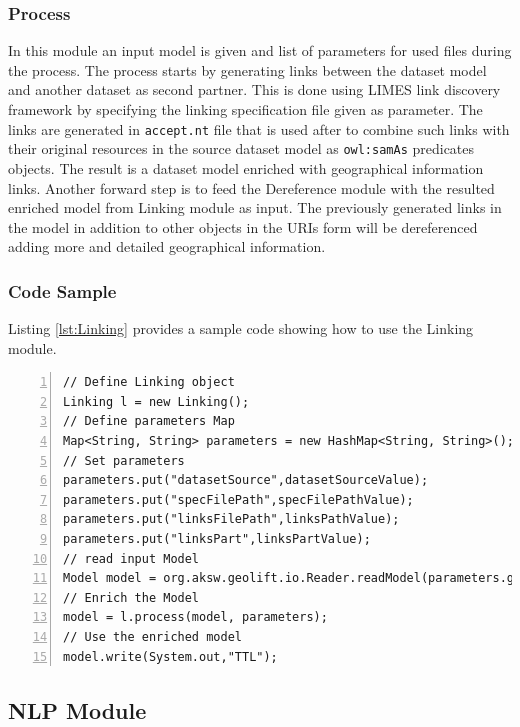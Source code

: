 \documentclass[a4paper,twoside,bibtotoc,abstracton,12pt,BCOR=15mm]{article}
\begin{document}
\subsubsection{Process}
In this module an input model is given and list of parameters for used files during the process. The process starts by generating links between the dataset model and another dataset as second partner. 
This is done using LIMES link discovery framework by specifying the linking specification file given as parameter.
The links are generated in \texttt{accept.nt} file that is used after to combine such links with their original resources in the source dataset model as \texttt{owl:samAs} predicates objects. The result is a dataset model enriched with geographical information links. 
Another forward step is to feed the Dereference module with the resulted enriched model from Linking module as input. 
The previously generated links in the model in addition to other objects in the URIs form will be dereferenced adding more and detailed geographical information.
\subsubsection{Code Sample}
Listing \ref{lst:Linking} provides a sample code showing how to use the Linking module.
\begingroup
    \fontsize{8pt}{10pt}\selectfont
\begin{lstlisting}[label=lst:Linking, numbers=left, numberstyle=\tiny, caption = Code fragment to call the \texttt{Linking} class.]
// Define Linking object
Linking l = new Linking();
// Define parameters Map
Map<String, String> parameters = new HashMap<String, String>();
// Set parameters
parameters.put("datasetSource",datasetSourceValue);
parameters.put("specFilePath",specFilePathValue);
parameters.put("linksFilePath",linksPathValue);
parameters.put("linksPart",linksPartValue);
// read input Model
Model model = org.aksw.geolift.io.Reader.readModel(parameters.get("datasetSource"));
// Enrich the Model
model = l.process(model, parameters);
// Use the enriched model
model.write(System.out,"TTL");
\end{lstlisting}
\endgroup


\subsection{NLP Module}
\end{document}
